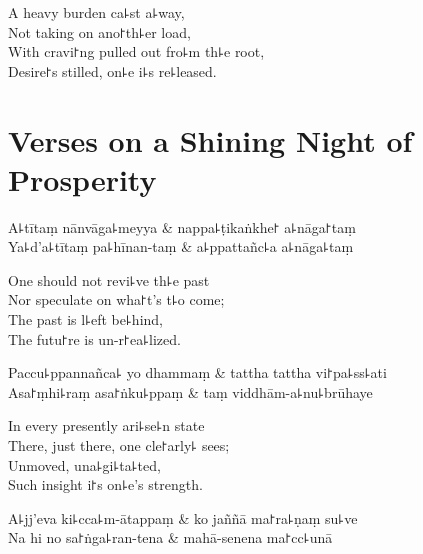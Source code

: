 \begin{english}
  A heavy burden ca꜕st a꜕way,\\
  Not taking on ano꜓th꜕er load,\\
  With cravi꜓ng pulled out fro꜕m th꜕e root,\\
  Desire꜓s stilled, on꜕e i꜕s re꜕leased.
\end{english}

\chapter{Verses on a Shining Night of Prosperity}%


\begin{leader}
\end{leader}

\begin{twochants}
  A꜕tītaṃ nānvāga꜕meyya & nappa꜕ṭikaṅkhe꜓ a꜕nāga꜓taṃ \\
  Ya꜕d'a꜕tītaṃ pa꜕hīnan-taṃ & a꜕ppattañc꜕a a꜕nāga꜕taṃ \\
\end{twochants}

\begin{english}
  One should not revi꜕ve th꜕e past\\
  Nor speculate on wha꜓t's t꜕o come;\\
  The past is l꜕eft be꜕hind,\\
  The futu꜓re is un-r꜓ea꜕lized.
\end{english}

\begin{twochants}
  Paccu꜕ppannañca꜕ yo dhammaṃ & tattha tattha vi꜓pa꜕ss꜕ati \\
  Asa꜓ṃhi꜕raṃ asa꜓ṅku꜕ppaṃ & taṃ viddhām-a꜕nu꜕brūhaye \\
\end{twochants}

\begin{english}
  In every presently ari꜕se꜕n state\\
  There, just there, one cle꜓arly꜕ sees;\\
  Unmoved, una꜕gi꜕ta꜕ted,\\
  Such insight i꜓s on꜕e's strength.
\end{english}

\begin{twochants}
  A꜕jj'eva ki꜕cca꜕m-ātappaṃ & ko jaññā ma꜓ra꜕ṇaṃ su꜕ve \\
  Na hi no sa꜓ṅga꜕ran-tena & mahā-senena ma꜓cc꜕unā \\
\end{twochants}

